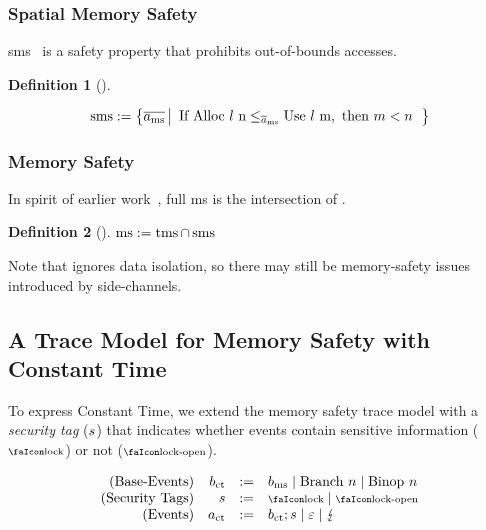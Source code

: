 \documentclass[acmsmall]{acmart}
\theoremstyle{definition}
\newtheorem{definition}{Definition}[section]
\begin{document}
\subsubsection{Spatial Memory Safety}

\gls*{sms}~\cite{nagarakatte2009soft} is a safety property that prohibits out-of-bounds accesses.

\begin{definition}[]\label{def:trace:smsdef}

  \noindent
  \[
  \smssafe:=\left\{\trace[_{\mssafe}] \left|\begin{array}{rcl}
      \text{If }\ev{Alloc\ \loc\ n}\le_{\trace_{\mssafe}}\ev{Use\ \loc\ m}, \text{ then }m<n
  \end{array}\right.\right\}
  \]
\end{definition}

\subsubsection{Memory Safety}

In spirit of earlier work~\cite{nagarakatte2009soft,nagarakatte2010cets,jim2002cyclone,necula2005ccured,michael2023mswasm}, full \gls*{ms} is the intersection of .

\begin{definition}[]\label{def:trace:msdef}
  $
  \operatorname{ms}:=\operatorname{tms} \cap \operatorname{sms}
  $
\end{definition}

Note that  ignores data isolation, so there may still be memory-safety issues introduced by side-channels.

\subsection{A Trace Model for Memory Safety with Constant Time}\label{subsec:scct:tracemodel}

To express Constant Time, we extend the memory safety trace model with a {\em security tag} ($s{}$) that indicates whether events contain sensitive information ($\lock$) or not ($\unlock$).

\vspace{-.5em}
\[
  \begin{array}{rrcl}
    (\text{Base-Events}) & \preevent[_{\ctsafe}] &:=& \preevent[_{\mssafe}] \mid \ev{Branch\ }n \mid \ev{Binop\ }n\\
    (\text{Security Tags}) & \securitytag{} &:=& \lock \mid \unlock\\ 
    (\text{Events}) & \event[_{\ctsafe}] &:=& \preevent[_{\ctsafe}];\securitytag{} \mid \emptyevent \mid \lightning \\ 
  \end{array}
\]
\end{document}
